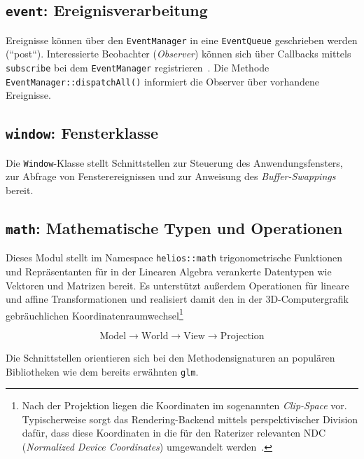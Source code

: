 \subsection*{\texttt{event}: Ereignisverarbeitung}
Ereignisse können über den \texttt{EventManager} in eine \texttt{EventQueue} geschrieben werden (``post``).
Interessierte Beobachter (\textit{Observer}) können sich über Callbacks mittels \texttt{subscribe} bei dem \texttt{EventManager} registrieren~\cite[293 ff.]{GHJV94}.
Die Methode \texttt{EventManager::dispatchAll()} informiert die Observer über vorhandene Ereignisse.

\subsection*{\texttt{window}: Fensterklasse}
Die \texttt{Window}-Klasse stellt Schnittstellen zur Steuerung des Anwendungsfensters, zur Abfrage von Fensterereignissen und zur Anweisung des \textit{Buffer-Swappings} bereit.


\subsection*{\texttt{math}: Mathematische Typen und Operationen}
Dieses Modul stellt im Namespace \texttt{helios::math} trigonometrische Funktionen und Repräsentanten für in der Linearen Algebra verankerte Datentypen wie Vektoren und Matrizen bereit.
Es unterstützt außerdem Operationen für lineare und affine Transformationen und realisiert damit den in der  3D-Computergrafik gebräuchlichen Koordinatenraumwechsel\footnote{
    Nach der Projektion liegen die Koordinaten im sogenannten \textit{Clip-Space} vor. Typischerweise sorgt das Rendering-Backend mittels perspektivischer Division dafür, dass diese Koordinaten in die für den Raterizer relevanten NDC (\textit{Normalized Device Coordinates}) umgewandelt werden~\cite[18]{AHHP+18}.
}

\[
    \text{Model}\rightarrow\text{World}\rightarrow\text{View}\rightarrow\text{Projection}
\]

\noindent

Die Schnittstellen orientieren sich bei den Methodensignaturen an populären Bibliotheken wie dem bereits erwähnten \texttt{glm}.


